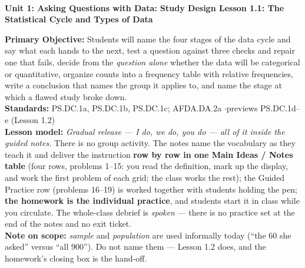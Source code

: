 \documentclass[10pt]{article}
\newcommand{\UnitNumberName}{Unit 1: Asking Questions with Data: Study Design \quad}
\newcommand{\LessonNumberName}{Lesson 1.1: The Statistical Cycle and Types of Data}
\begin{document}
\begin{center}
    {\Large\bfseries \CourseName \\
    {\small\bfseries \UnitNumberName \LessonNumberName}}
\end{center}

\begin{tcolorbox}[colback=frost, colframe=cerulean, boxrule=0.9pt, arc=2mm,
    left=2mm, right=2mm, top=1.5mm, bottom=1.5mm]
    \textbf{Primary Objective:} Students will name the four stages of the data cycle and say
    what each hands to the next, test a question against three checks and repair one that
    fails, decide from the \emph{question alone} whether the data will be categorical or
    quantitative, organize counts into a frequency table with relative frequencies, write a
    conclusion that names the group it applies to, and name the stage at which a flawed study
    broke down.
    \\[2pt]
    \textbf{Standards:} PS.DC.1a, PS.DC.1b, PS.DC.1c; AFDA.DA.2a \quad$\cdot$\quad previews
    PS.DC.1d--e (Lesson 1.2)
    \\[2pt]
    \textbf{Lesson model:} \emph{Gradual release --- I do, we do, you do --- all of it inside
    the guided notes.} There is no group activity. The notes name the vocabulary as they teach
    it and deliver the instruction \textbf{row by row in one Main Ideas / Notes table} (four
    rows, problems 1--15: you read the definition, mark up the display, and work the first
    problem of each grid; the class works the rest); the Guided Practice row (problems 16--19)
    is worked together with students holding the pen; \textbf{the homework is the individual
    practice}, and students start it in class while you circulate. The whole-class debrief is
    \emph{spoken} --- there is no practice set at the end of the notes and no exit ticket.
    \\[2pt]
    \textbf{Note on scope:} \emph{sample} and \emph{population} are used informally today
    (``the $60$ she asked'' versus ``all $900$''). Do not name them --- Lesson 1.2 does, and
    the homework's closing box is the hand-off.
\end{tcolorbox}
\end{document}
